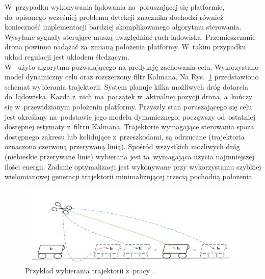 W~przypadku wykonywania lądowania na~poruszającej się platformie, do~opisanego wcześniej problemu detekcji znacznika dochodzi również konieczność implementacji bardziej skomplikowanego algorytmu sterowania. Wysyłane sygnały sterujące muszą uwzględniać ruch lądowiska. Przemieszczanie drona powinno nadążać za~zmianą położenia platformy. W~takim przypadku układ regulacji jest układem śledzącym.\\ 
W~\cite{Falanga} użyto algorytmu pozwalającego na predykcję zachowania celu. Wykorzystano model dynamiczny celu oraz rozszerzony filtr Kalmana. Na Rys.~\ref{fig:trajektorie} przedstawiono schemat wybierania trajektorii. System planuje kilka możliwych dróg dotarcia do~lądowiska. Każda z~nich ma~początek w~aktualnej pozycji drona, a~kończy się w~przewidzianym położeniu platformy. Przyszły stan poruszającego się celu jest określany na~podstawie jego modelu dynamicznego, począwszy od~ostatniej dostępnej estymaty z~filtru Kalmana. Trajektorie wymagające sterowania spoza dostępnego zakresu lub kolidujące z~przeszkodami, są odrzucane (trajektoria oznaczona czerwoną przerywaną linią). Spośród wszystkich możliwych dróg (niebieskie przerywane linie) wybierana jest ta~wymagająca użycia najmniejszej ilości energii. Zadanie optymalizacji jest wykonywane przy wykorzystaniu szybkiej wielomianowej generacji trajektorii minimalizującej trzecią pochodną położenia.\par
\begin{figure}[h]
	\centering
	\includegraphics[width=\textwidth]{trajektorie.jpg}
	\caption{Przykład wybierania trajektorii z~pracy \cite{Falanga}.}
	\label{fig:trajektorie}
\end{figure}


